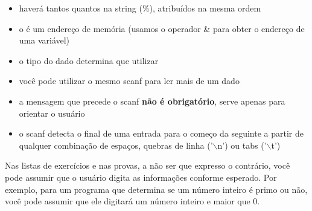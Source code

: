 \documentclass[portuguese,10pt,xcolor=table]{beamer}
\begin{document}
    \begin{frame}
        \begin{itemize}
			\item haverá tantos  quantos  na string (\%), atribuídos na mesma ordem
			\item o  é um endereço de memória (usamos o operador \& para obter o endereço de uma variável)
            
		\item o tipo do dado determina que  utilizar
            
        \end{itemize}
    \end{frame}

    \begin{frame}
        \begin{itemize}
			\item você pode utilizar o mesmo scanf para ler mais de um dado
            
        \end{itemize}
    \end{frame}
	
    \begin{frame}
        \begin{itemize}
		\item a mensagem que precede o scanf \textbf{não é obrigatório}, serve apenas para orientar o usuário
            
			\item o scanf detecta o final de uma entrada para o começo da seguinte a partir de qualquer combinação de espaços, quebras de linha ('$\backslash$n') ou tabs ('$\backslash$t')
        \end{itemize}
    \end{frame}

\begin{frame}
Nas listas de exercícios e nas provas, a não ser que expresso o contrário, você pode assumir que o usuário digita as informações conforme esperado. Por exemplo, para um programa que determina se um número inteiro é primo ou não, você pode assumir que ele digitará um número inteiro e maior que 0.
\end{frame}
\end{document}
